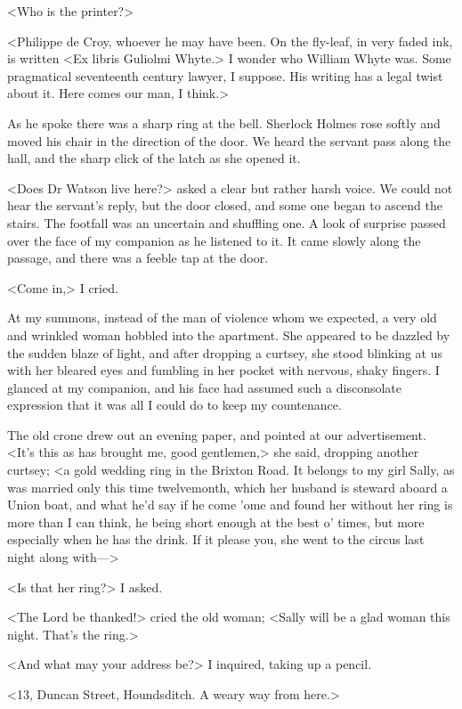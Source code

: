 <Who is the printer?>

<Philippe de Croy, whoever he may have been. On the fly-leaf, in very faded ink, is written <Ex libris Guliolmi Whyte.> I wonder who William Whyte was. Some pragmatical seventeenth century lawyer, I suppose. His writing has a legal twist about it. Here comes our man, I think.>

As he spoke there was a sharp ring at the bell. Sherlock Holmes rose softly and moved his chair in the direction of the door. We heard the servant pass along the hall, and the sharp click of the latch as she opened it.

<Does Dr Watson live here?> asked a clear but rather harsh voice. We could not hear the servant's reply, but the door closed, and some one began to ascend the stairs. The footfall was an uncertain and shuffling one. A look of surprise passed over the face of my companion as he listened to it. It came slowly along the passage, and there was a feeble tap at the door.

<Come in,> I cried.

At my summons, instead of the man of violence whom we expected, a very old and wrinkled woman hobbled into the apartment. She appeared to be dazzled by the sudden blaze of light, and after dropping a curtsey, she stood blinking at us with her bleared eyes and fumbling in her pocket with nervous, shaky fingers. I glanced at my companion, and his face had assumed such a disconsolate expression that it was all I could do to keep my countenance.

The old crone drew out an evening paper, and pointed at our advertisement. <It's this as has brought me, good gentlemen,> she said, dropping another curtsey; <a gold wedding ring in the Brixton Road. It belongs to my girl Sally, as was married only this time twelvemonth, which her husband is steward aboard a Union boat, and what he'd say if he come 'ome and found her without her ring is more than I can think, he being short enough at the best o' times, but more especially when he has the drink. If it please you, she went to the circus last night along with—>

<Is that her ring?> I asked.

<The Lord be thanked!> cried the old woman; <Sally will be a glad woman this night. That's the ring.>

<And what may your address be?> I inquired, taking up a pencil.

<13, Duncan Street, Houndsditch. A weary way from here.>

